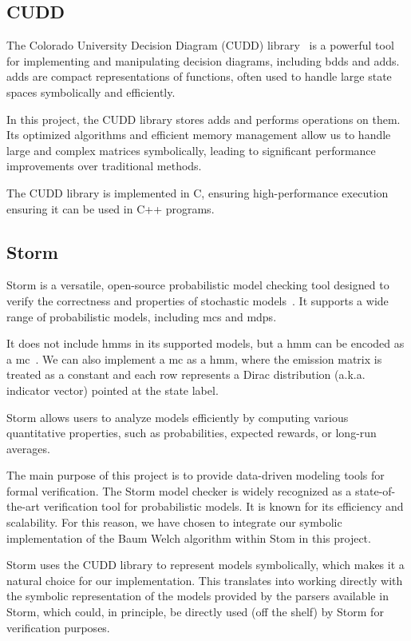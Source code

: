 \subsection{CUDD}\label{subsec:cudd}
The Colorado University Decision Diagram (CUDD) library~\cite{somenzi1997cudd} is a powerful tool for implementing and manipulating decision diagrams, including \glspl{bdd} and \glspl{add}. \glspl{add} are compact representations of functions, often used to handle large state spaces symbolically and efficiently.

In this project, the CUDD library stores \glspl{add} and performs operations on them.
Its optimized algorithms and efficient memory management allow us to handle large and complex matrices symbolically, leading to significant performance improvements over traditional methods.

The CUDD library is implemented in C, ensuring high-performance execution ensuring it can be used in C++ programs.

\subsection{Storm}\label{subsec:storm}
Storm is a versatile, open-source probabilistic model checking tool designed to verify the correctness and properties of stochastic models~\cite{hensel2021probabilistic}. 
It supports a wide range of probabilistic models, including \glspl{mc} and \glspl{mdp}.

It does not include \glspl{hmm} in its supported models, but a \gls{hmm} can be encoded as a \gls{mc}~\cite{rabiner1989tutorial}.
We can also implement a \gls{mc} as a \gls{hmm}, where the emission matrix is treated as a constant and each row represents a Dirac distribution (a.k.a. indicator vector) pointed at the state label. 

Storm allows users to analyze models efficiently by computing various quantitative properties, such as probabilities, expected rewards, or long-run averages.

The main purpose of this project is to provide data-driven modeling tools for formal verification.
The Storm model checker is widely recognized as a state-of-the-art verification tool for probabilistic models. It is known for its efficiency and scalability.
For this reason, we have chosen to integrate our symbolic implementation of the Baum Welch algorithm within Stom in this project. 

Storm uses the CUDD library to represent models symbolically, which makes it a natural choice for our implementation.
This translates into working directly with the symbolic representation of the models provided by the parsers available in Storm, which could, in principle, be directly used (off the shelf) by Storm for verification purposes.

